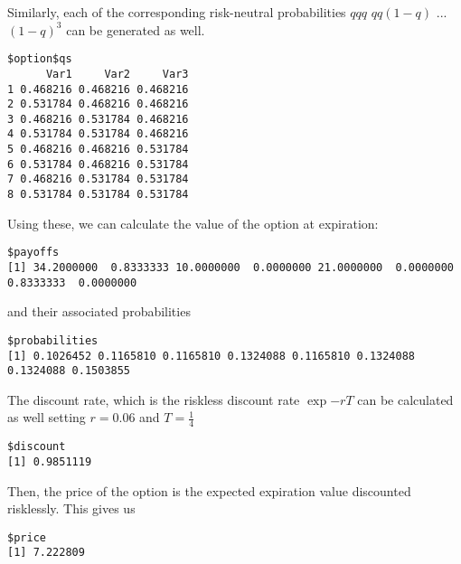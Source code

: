 \documentclass[11pt]{scrartcl}
\begin{document}
Similarly, each of the corresponding risk-neutral probabilities $qqq$ $qq(1-q)$ ... $(1-q)^3$ can be generated as well.

\begin{lstlisting}
$option$qs
      Var1     Var2     Var3
1 0.468216 0.468216 0.468216
2 0.531784 0.468216 0.468216
3 0.468216 0.531784 0.468216
4 0.531784 0.531784 0.468216
5 0.468216 0.468216 0.531784
6 0.531784 0.468216 0.531784
7 0.468216 0.531784 0.531784
8 0.531784 0.531784 0.531784
\end{lstlisting}

Using these, we can calculate the value of the option at expiration:

\begin{lstlisting}
$payoffs
[1] 34.2000000  0.8333333 10.0000000  0.0000000 21.0000000  0.0000000  0.8333333  0.0000000
\end{lstlisting}

and their associated probabilities

\begin{lstlisting}
$probabilities
[1] 0.1026452 0.1165810 0.1165810 0.1324088 0.1165810 0.1324088 0.1324088 0.1503855
\end{lstlisting}

The discount rate, which is the riskless discount rate $\exp{-rT}$ can be calculated as well setting $r=0.06$ and $T=\frac{1}{4}$

\begin{lstlisting}
$discount
[1] 0.9851119
\end{lstlisting}

Then, the price of the option is the expected expiration value discounted risklessly. This gives us

\begin{lstlisting}
$price
[1] 7.222809
\end{lstlisting}
\end{document}
